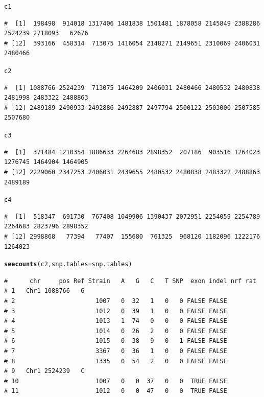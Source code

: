\documentclass{article}\usepackage[]{graphicx}\usepackage[]{color}
\makeatletter
\newcommand{\hlstd}[1]{\textcolor[rgb]{0.345,0.345,0.345}{#1}}%
\newcommand{\hlkwc}[1]{\textcolor[rgb]{0.333,0.667,0.333}{#1}}%
\newcommand{\hlkwd}[1]{\textcolor[rgb]{0.737,0.353,0.396}{\textbf{#1}}}%
\newenvironment{kframe}{%
 \def\at@end@of@kframe{}%
 \ifinner\ifhmode%
  \def\at@end@of@kframe{\end{minipage}}%
  \begin{minipage}{\columnwidth}%
 \fi\fi%
 \def\FrameCommand##1{\hskip\@totalleftmargin \hskip-\fboxsep
 \colorbox{shadecolor}{##1}\hskip-\fboxsep
     \hskip-\linewidth \hskip-\@totalleftmargin \hskip\columnwidth}%
 \MakeFramed {\advance\hsize-\width
   \@totalleftmargin\z@ \linewidth\hsize
   \@setminipage}}%
 {\par\unskip\endMakeFramed%
 \at@end@of@kframe}
\newenvironment{knitrout}{}{} %
\makeatother
\begin{document}
\begin{knitrout}
\begin{kframe}
\begin{alltt}
\hlstd{c1}
\end{alltt}
\begin{verbatim}
#  [1]  198498  914018 1317406 1481838 1501481 1878058 2145849 2388286 2524239 2718093   62676
# [12]  393166  458314  713075 1416054 2148271 2149651 2310069 2406031 2480466
\end{verbatim}
\begin{alltt}
\hlstd{c2}
\end{alltt}
\begin{verbatim}
#  [1] 1088766 2524239  713075 1464209 2406031 2480466 2480532 2480838 2481998 2483322 2488863
# [12] 2489189 2490933 2492886 2492887 2497794 2500122 2503000 2507585 2507680
\end{verbatim}
\begin{alltt}
\hlstd{c3}
\end{alltt}
\begin{verbatim}
#  [1]  371484 1210354 1886633 2264683 2898352  207186  903516 1264023 1276745 1464904 1464905
# [12] 2229060 2347253 2406031 2439655 2480532 2480838 2483322 2488863 2489189
\end{verbatim}
\begin{alltt}
\hlstd{c4}
\end{alltt}
\begin{verbatim}
#  [1]  518347  691730  767408 1049906 1390437 2072951 2254059 2254789 2264683 2823796 2898352
# [12] 2998868   77394   77407  155680  761325  968120 1182096 1222176 1264023
\end{verbatim}
\begin{alltt}
\hlkwd{seecounts}\hlstd{(c2,}\hlkwc{snp.tables}\hlstd{=snp.tables)}
\end{alltt}
\begin{verbatim}
#      chr     pos Ref Strain   A   G   C   T SNP  exon indel nrf rat
# 1   Chr1 1088766   G                                               
# 2                      1007   0  32   1   0   0 FALSE FALSE        
# 3                      1012   0  39   1   0   0 FALSE FALSE        
# 4                      1013   1  74   0   0   0 FALSE FALSE        
# 5                      1014   0  26   2   0   0 FALSE FALSE        
# 6                      1015   0  38   9   0   1 FALSE FALSE        
# 7                      3367   0  36   1   0   0 FALSE FALSE        
# 8                      1335   0  54   2   0   0 FALSE FALSE        
# 9   Chr1 2524239   C                                               
# 10                     1007   0   0  37   0   0  TRUE FALSE        
# 11                     1012   0   0  47   0   0  TRUE FALSE        

\end{verbatim}
\end{kframe}
\end{knitrout}
\end{document}
